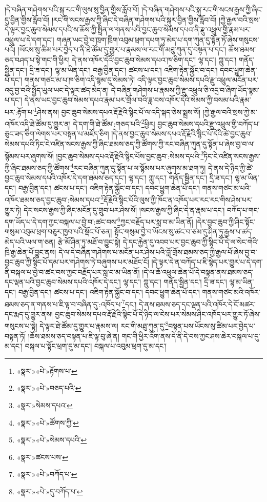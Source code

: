 །དེ་བཞིན་གཤེགས་པའི་སྐུ་རང་གི་ལུས་སུ་བྱིན་གྱིས་རློབ་བོ། །དེ་བཞིན་གཤེགས་པའི་སྐུ་རང་གི་སངས་རྒྱས་ཀྱི་ཞིང་དུ་བྱིན་གྱིས་རློབ་བོ། །རང་གི་སངས་རྒྱས་ཀྱི་ཞིང་དེ་བཞིན་གཤེགས་པའི་སྐུར་བྱིན་གྱིས་རློབ་བོ། །ཀྱེ་རྒྱལ་བའི་སྲས་དེ་ལྟར་བྱང་ཆུབ་སེམས་དཔའི་ས་ཆོས་ཀྱི་སྤྲིན་ལ་གནས་པའི་བྱང་ཆུབ་སེམས་དཔའ་ནི་རྫུ་འཕྲུལ་གྱི་རྣམ་པར་འཕྲུལ་པ་དེ་དག་དང་། གཞན་ཡང་བྱེ་བ་ཁྲག་ཁྲིག་འབུམ་ཕྲག་དཔག་ཏུ་མེད་པ་དག་ཀུན་དུ་སྟོན་ཏོ་ཞེས་གསུངས་པའོ། །ཡོངས་སུ་ཚིམ་པར་བྱེད་པ་ནི་ཐེ་ཚོམ་དུ་གྱུར་པ་རྣམས་ལ་རང་གི་མཐུ་ཀུན་དུ་བསྟན་པ་དང་། ཆོས་ཐམས་ཅད་བཤད་པ་སྟེ་གང་གི་ཕྱིར། དེ་ནས་འཁོར་དེའི་བྱང་ཆུབ་སེམས་དཔའ་ཁ་ཅིག་དང་། ལྷ་དང་། ཀླུ་དང་། གནོད་སྦྱིན་དང་། དྲི་ཟ་དང་། ལྷ་མ་ཡིན་དང་། བརྒྱ་བྱིན་དང་། ཚངས་པ་དང་། འཇིག་རྟེན་སྐྱོང་བ་དང་། དབང་ཕྱུག་ཆེན་པོ་དང་། གནས་གཙང་མ་པ་ཁ་ཅིག་འདི་སྙམ་དུ་སེམས་ཏེ། འདི་ལྟར་བྱང་ཆུབ་སེམས་དཔའི་རྫུ་འཕྲུལ་མངོན་པར་འདུ་བྱ་བའི་སྤྱོད་ཡུལ་ཡང་དེ་ལྟར་ཚད་མེད་ན། དེ་བཞིན་གཤེགས་པ་རྣམས་ཀྱི་རྫུ་འཕྲུལ་ཅི་འདྲ་བ་ཞིག་ཡོད་སྙམ་པ་དང་། དེ་ནས་ཡང་བྱང་ཆུབ་སེམས་དཔའ་རྣམ་པར་གྲོལ་བའི་ཟླ་བས་འཁོར་དེའི་སེམས་ཀྱི་བསམ་པའི་རྣམ་པར་:རྟོག་པ་\footnote{«སྣར་»«པེ་»རྟོགས་པ་}ཤེས་ནས། བྱང་ཆུབ་སེམས་དཔའ་རྡོ་རྗེའི་སྙིང་པོ་ལ་འདི་སྐད་ཅེས་སྨྲས་སོ། །ཀྱེ་རྒྱལ་བའི་སྲས་ཀྱེ་མ་འཁོར་འདི་ཐེ་ཚོམ་དུ་གྱུར་ན། དེ་དག་གི་ཐེ་ཚོམ་:གཅད་པའི་\footnote{«སྣར་»«པེ་»བཅད་པའི་}ཕྱིར། བྱང་ཆུབ་སེམས་དཔའི་རྫུ་འཕྲུལ་གྱི་བཀོད་པ་ཅུང་ཟད་ཅིག་ལེགས་པར་བསྟན་པ་མཛོད་ཅིག །དེ་ནས་བྱང་ཆུབ་སེམས་དཔའ་རྡོ་རྗེའི་སྙིང་པོ་དེའི་ཚེ་བྱང་ཆུབ་སེམས་དཔའི་ཏིང་ངེ་འཛིན་སངས་རྒྱས་ཀྱི་ཞིང་ཐམས་ཅད་ཀྱི་ཚོགས་ཀྱི་རང་བཞིན་ཀུན་དུ་སྟོན་པ་ཞེས་བྱ་བ་ལ་སྙོམས་པར་ཞུགས་སོ། །བྱང་ཆུབ་སེམས་དཔའ་རྡོ་རྗེའི་སྙིང་པོས་བྱང་ཆུབ་:སེམས་དཔའི་\footnote{«སྣར་»སེམས་དཔའ་}ཏིང་ངེ་འཛིན་སངས་རྒྱས་ཀྱི་ཞིང་ཐམས་ཅད་ཀྱི་ཚོགས་\footnote{«སྣར་»«པེ་»ཚོགས་ཀྱི་}རང་བཞིན་ཀུན་དུ་སྟོན་པ་ལ་སྙོམས་པར་ཞུགས་མ་ཐག་ཏུ། དེ་ནས་དེ་ཉིད་ཀྱི་ཚེ་བྱང་ཆུབ་སེམས་དཔའི་འཁོར་དེ་དག་ཐམས་ཅད་དང་། ལྷ་དང་། ཀླུ་དང་། གནོད་སྦྱིན་དང་། དྲི་ཟ་དང་། ལྷ་མ་ཡིན་དང་། བརྒྱ་བྱིན་དང་། ཚངས་པ་དང་། འཇིག་རྟེན་སྐྱོང་བ་དང་། དབང་ཕྱུག་ཆེན་པོ་དང་། གནས་གཙང་མ་པའི་འཁོར་ཐམས་ཅད་བྱང་ཆུབ་:སེམས་དཔའ་\footnote{«སྣར་»«པེ་»སེམས་དཔའི་}རྡོ་རྗེའི་སྙིང་པོའི་ལུས་ཀྱི་ཁོང་ན་འཁོད་པར་རང་རང་གིས་ཤེས་པར་གྱུར་ཏེ། དེར་སངས་རྒྱས་ཀྱི་ཞིང་མངོན་དུ་གྲུབ་པར་ཤེས་སོ། །སངས་རྒྱས་ཀྱི་ཞིང་དེ་ན་རྣམ་པ་དང་། བཀོད་པ་གང་དག་ཡོད་པ་དེ་དག་ཀྱང་བསྐལ་པ་བྱེ་བ་:ཚང་བས་\footnote{«སྣར་»ཚངས་པས་}ཀྱང་བརྗོད་པར་སླ་བ་མ་ཡིན་ནོ། །དེར་བྱང་ཆུབ་ཀྱི་ཤིང་སྟོང་གསུམ་འབུམ་ཕྲག་བཅུར་ཁྱབ་པའི་སྡོང་པོ་ཅན། སྟོང་གསུམ་བྱེ་བ་ཡོངས་སུ་ཚང་བ་ཙམ་དུ་ཤིན་ཏུ་རྒྱས་པ་ཚད་མེད་པའི་ཡལ་ག་ཅན། རྩེ་མོ་ཤིན་ཏུ་མཐོ་བ་བྱུང་སྟེ། དེ་དང་རྐྱེན་དུ་འབབ་པར་བྱང་ཆུབ་ཀྱི་སྙིང་པོ་དེ་ལ་སེང་གེའི་ཁྲི་རྒྱ་ཆེན་པོ་བྱུང་ནས། དེ་ལ་དེ་བཞིན་གཤེགས་པ་མངོན་པར་ཤེས་པའི་བློ་གྲོས་ཐམས་ཅད་ཀྱི་རྒྱལ་པོ་ཞེས་བྱ་བ་བྱང་ཆུབ་ཀྱི་སྙིང་པོ་དམ་པར་གཤེགས་ཏེ་བཞུགས་པར་མཐོང་ངོ། །དེ་ལྟར་དེ་ན་བཀོད་པ་ཇི་སྙེད་པར་གྱུར་པ་དེ་དག་ནི་བསྐལ་པ་བྱེ་བ་ཚང་བས་ཀྱང་བརྗོད་པར་སླ་བ་མ་ཡིན་ནོ། །དེ་ལ་ཆོ་འཕྲུལ་ཆེན་པོ་དེ་བསྟན་ནས་ཐམས་ཅད་དང་ལྡན་པའི་བྱང་ཆུབ་སེམས་དཔའི་འཁོར་དེ་དང་། ལྷ་དང་། ཀླུ་དང་། གནོད་སྦྱིན་དང་། དྲི་ཟ་དང་། ལྷ་མ་ཡིན་དང་། བརྒྱ་བྱིན་དང་། ཚངས་པ་དང་། འཇིག་རྟེན་སྐྱོང་བ་དང་། དབང་ཕྱུག་ཆེན་པོ་དང་། གནས་གཙང་མའི་འཁོར་ཐམས་ཅད་ན་གནས་པ་ཇི་ལྟ་བ་བཞིན་དུ་:འཁོད་པ་\footnote{«སྣར་»«པེ་»བཀོད་པ་}དང་། དེ་ནས་ཐམས་ཅད་དང་ལྡན་པའི་འཁོར་དེ་ངོ་མཚར་དང་རྨད་དུ་གྱུར་ནས། བྱང་ཆུབ་སེམས་དཔའ་རྡོ་རྗེའི་སྙིང་པོ་དེ་ཉིད་ལ་ངེས་པར་སེམས་ཤིང་འཁོད་པར་གྱུར་ཏོ་ཞེས་གསུངས་པ་སྟེ། དེ་ལྟར་ཐེ་ཚོམ་དུ་གྱུར་པ་རྣམས་ལ། རང་གི་མཐུ་ཀུན་དུ་\footnote{«སྣར་»«པེ་»དུ་བཀོད་པ་}བསྟན་པས་ཡོངས་སུ་ཚིམ་པར་བྱེད་པ་བསྟན་ཏོ། །ཆོས་ཐམས་ཅད་བསྟན་པ་ཇི་ལྟ་བུ་ཞེ་ན། གང་གི་ཕྱིར་འོག་ནས་དེ་ནི་དེ་བས་ཀྱང་ཤས་ཆེར་བསྐལ་པ་དུ་མ་དང་། བསྐལ་པ་སྟོང་ཕྲག་དུ་མ་དང་། བསྐལ་པ་འབུམ་ཕྲག་དུ་མ་དང་། 